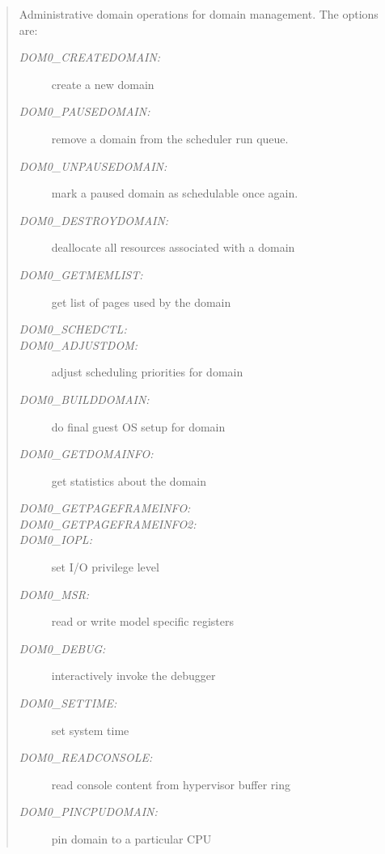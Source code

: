 \documentclass[11pt,twoside,final,openright]{xenstyle}
\begin{document}
\begin{quote}

Administrative domain operations for domain management. The options are:

\begin{description} 
\item [\it DOM0\_CREATEDOMAIN:] create a new domain

\item [\it DOM0\_PAUSEDOMAIN:] remove a domain from the scheduler run 
queue. 

\item [\it DOM0\_UNPAUSEDOMAIN:] mark a paused domain as schedulable
  once again. 

\item [\it DOM0\_DESTROYDOMAIN:] deallocate all resources associated
with a domain

\item [\it DOM0\_GETMEMLIST:] get list of pages used by the domain

\item [\it DOM0\_SCHEDCTL:]

\item [\it DOM0\_ADJUSTDOM:] adjust scheduling priorities for domain

\item [\it DOM0\_BUILDDOMAIN:] do final guest OS setup for domain

\item [\it DOM0\_GETDOMAINFO:] get statistics about the domain

\item [\it DOM0\_GETPAGEFRAMEINFO:] 

\item [\it DOM0\_GETPAGEFRAMEINFO2:]

\item [\it DOM0\_IOPL:] set I/O privilege level

\item [\it DOM0\_MSR:] read or write model specific registers

\item [\it DOM0\_DEBUG:] interactively invoke the debugger

\item [\it DOM0\_SETTIME:] set system time

\item [\it DOM0\_READCONSOLE:] read console content from hypervisor buffer ring

\item [\it DOM0\_PINCPUDOMAIN:] pin domain to a particular CPU


\end{description}
\end{quote}
\end{document}
